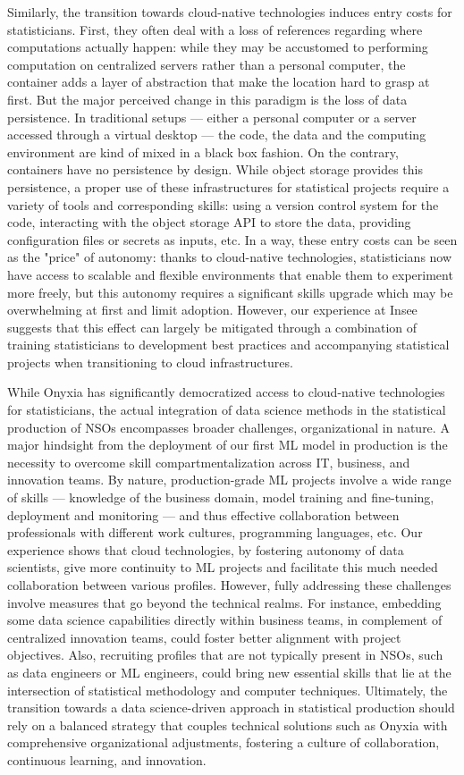 \documentclass[graybox]{svmult}
\begin{document}
Similarly, the transition towards cloud-native technologies induces entry costs for statisticians. First, they often deal with a loss of references regarding where computations actually happen: while they may be accustomed to performing computation on centralized servers rather than a personal computer, the container adds a layer of abstraction that make the location hard to grasp at first. But the major perceived change in this paradigm is the loss of data persistence. In traditional setups — either a personal computer or a server accessed through a virtual desktop — the code, the data and the computing environment are kind of mixed in a black box fashion. On the contrary, containers have no persistence by design. While object storage provides this persistence, a proper use of these infrastructures for statistical projects require a variety of tools and corresponding skills: using a version control system for the code, interacting with the object storage API to store the data, providing configuration files or secrets as inputs, etc. In a way, these entry costs can be seen as the "price" of autonomy: thanks to cloud-native technologies, statisticians now have access to scalable and flexible environments that enable them to experiment more freely, but this autonomy requires a significant skills upgrade which may be overwhelming at first and limit adoption. However, our experience at Insee suggests that this effect can largely be mitigated through a combination of training statisticians to development best practices and accompanying statistical projects when transitioning to cloud infrastructures.

While Onyxia has significantly democratized access to cloud-native technologies for statisticians, the actual integration of data science methods in the statistical production of NSOs encompasses broader challenges, organizational in nature. A major hindsight from the deployment of our first ML model in production is the necessity to overcome skill compartmentalization across IT, business, and innovation teams. By nature, production-grade ML projects involve a wide range of skills — knowledge of the business domain, model training and fine-tuning, deployment and monitoring — and thus effective collaboration between professionals with different work cultures, programming languages, etc. Our experience shows that cloud technologies, by fostering autonomy of data scientists, give more continuity to ML projects and facilitate this much needed collaboration between various profiles. However, fully addressing these challenges involve measures that go beyond the technical realms. For instance, embedding some data science capabilities directly within business teams, in complement of centralized innovation teams, could foster better alignment with project objectives. Also, recruiting profiles that are not typically present in NSOs, such as data engineers or ML engineers, could bring new essential skills that lie at the intersection of statistical methodology and computer techniques. Ultimately, the transition towards a data science-driven approach in statistical production should rely on a balanced strategy that couples technical solutions such as Onyxia with comprehensive organizational adjustments, fostering a culture of collaboration, continuous learning, and innovation.



\end{document}
